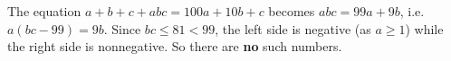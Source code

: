The equation $a+b+c+abc=100a+10b+c$ becomes $abc=99a+9b$, i.e. $a(bc-99)=9b$. Since $bc\le81<99$, the left side is negative (as $a\ge1$) while the right side is nonnegative. So there are \textbf{no} such numbers.
